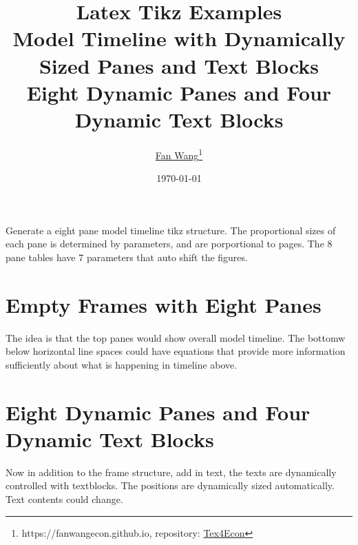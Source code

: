 \documentclass{article}
\title{Latex Tikz Examples\\Model Timeline with Dynamically Sized Panes and Text Blocks \\ Eight Dynamic Panes and Four Dynamic Text Blocks}
\author{\href{https://fanwangecon.github.io/}{Fan Wang}\thanks{https://fanwangecon.github.io, repository: \href{https://fanwangecon.github.io/Tex4Econ/}{Tex4Econ}}}
\date{\today}
\newcommand{\tikzframeeight}[7]{

  \def\fgiw{#1*\textwidth*#7}  
  \def\fgih{#2*\textheight*#7}

  \def\fgiwm{#3*\fgiw}
  \def\fgihm{#4*\fgih}

  \def\fgile{#5*\fgiw}
  \def\fgire{#6*\fgiw}

  \def\fgiwlm{\fgile*0.5 + \fgiwm*0.5}
  \def\fgiwrm{\fgiwm*0.5 + \fgire*0.5}

  \def\fgihtb{\fgihm + \fgih*0.085 - \fgihm*0.085}

  \def\fgihtm{\fgihm*0.5 + \fgih*0.5}
  \def\fgihbm{\fgihm*0.5}



  \draw [dotted] (0, \fgih) -- (\fgiw, \fgih);
  \draw [dotted] (0, 0    ) -- (\fgiw, 0    );

  \draw [dotted] (0,     0) -- (0,     \fgih);
  \draw [dotted] (\fgiw, 0) -- (\fgiw, \fgih);

  \draw [dotted] (\fgiwm, 0) -- (\fgiwm,   \fgih);
  \draw [solid] (0, \fgihm) -- (\fgiw,   \fgihm);

  \draw[dashed] (\fgile, 0  ) -- (\fgile,   \fgih);
  \draw[dashed] (\fgire, 0  ) -- (\fgire,   \fgih);

  \node[align=center] at (0.5*\fgile,             0.900*\fgih) {last\\period};
  \node[align=center] at (0.5*\fgiw,              0.900*\fgih) {current period};
  \node[align=center] at (0.5*\fgire + 0.5*\fgiw, 0.900*\fgih) {next\\period};

  \node[align=center] at (\fgiwlm, \fgihtb) {shocks};
  \node[align=center] at (\fgiwrm, \fgihtb) {asset choices};

  \draw [->, line width=0.25mm] (\fgile-0.2*\fgile, \fgihtm) -- (\fgile+0.2*\fgile, \fgihtm);
  \draw [->, line width=0.25mm] (\fgiwm-0.2*\fgile, \fgihtm) -- (\fgiwm+0.2*\fgile, \fgihtm);
  \draw [->, line width=0.25mm] (\fgire-0.2*\fgile, \fgihtm) -- (\fgire+0.2*\fgile, \fgihtm);
}
\begin{document}
\maketitle

Generate a eight pane model timeline tikz structure. The proportional sizes of each pane is determined by parameters, and are porportional to pages. The 8 pane tables have 7 parameters that auto shift the figures.


\section{Empty Frames with Eight Panes}
The idea is that the top panes would show overall model timeline. The bottomw below horizontal line spaces could have equations that provide more information sufficiently about what is happening in timeline above. 
\begin{center}
\end{center}
\begin{center}
\end{center}
\begin{center}
\end{center}
\pagebreak

\section{Eight Dynamic Panes and Four Dynamic Text Blocks}

Now in addition to the frame structure, add in text, the texts are dynamically controlled with textblocks. The positions are dynamically sized automatically. Text contents could change. 
\end{document}
